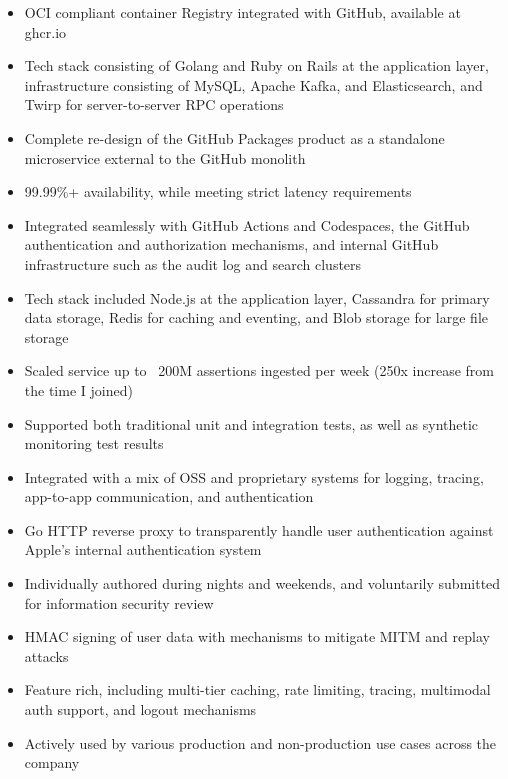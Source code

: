 \documentclass[11pt,letterpaper,sans]{moderncv}        %
\begin{document}
\begin{itemize}
\item OCI compliant container Registry integrated with GitHub, available at ghcr.io
\item Tech stack consisting of Golang and Ruby on Rails at the application layer, infrastructure consisting of MySQL, Apache Kafka, and Elasticsearch, and Twirp for server-to-server RPC operations
\item Complete re-design of the GitHub Packages product as a standalone microservice external to the GitHub monolith
\item 99.99\%+ availability, while meeting strict latency requirements
\item Integrated seamlessly with GitHub Actions and Codespaces, the GitHub authentication and authorization mechanisms, and internal GitHub infrastructure such as the audit log and search clusters
\end{itemize}

\begin{itemize}
\item Tech stack included Node.js at the application layer, Cassandra for primary data storage, Redis for caching and eventing, and Blob storage for large file storage
\item Scaled service up to ~200M assertions ingested per week (250x increase from the time I joined)
\item Supported both traditional unit and integration tests, as well as synthetic monitoring test results
\item Integrated with a mix of OSS and proprietary systems for logging, tracing, app-to-app communication, and authentication
\end{itemize}

\begin{itemize}
\item Go HTTP reverse proxy to transparently handle user authentication against Apple's internal authentication system
\item Individually authored during nights and weekends, and voluntarily submitted for information security review
\item HMAC signing of user data with mechanisms to mitigate MITM and replay attacks
\item Feature rich, including multi-tier caching, rate limiting, tracing, multimodal auth support, and logout mechanisms
\item Actively used by various production and non-production use cases across the company
\end{itemize}
\end{document}
